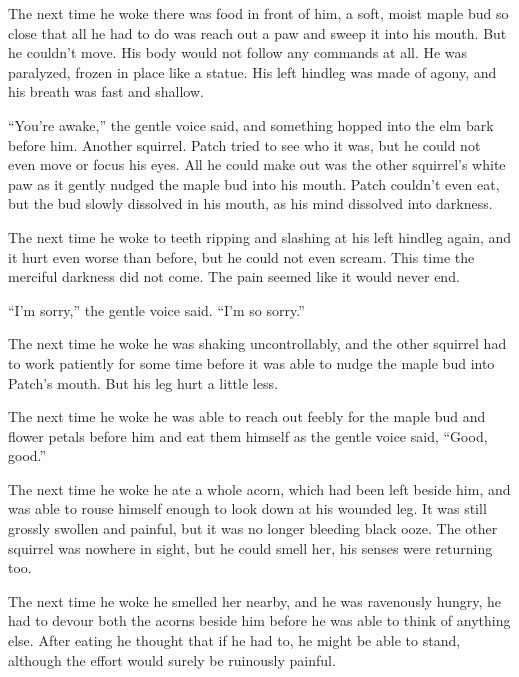 \documentclass[ebook,oneside,openany,17pt]{memoir}
\newenvironment{tolerant}[1]{%
  \par\tolerance=#1\relax
}{%
  \par
}
\begin{document}
The next time he woke there was food in front of him, a soft, moist
maple bud so close that all he had to do was reach out a paw and sweep
it into his mouth. But he couldn’t move. His body would not follow any
commands at all. He was paralyzed, frozen in place like a statue. His
left hindleg was made of agony, and his breath was fast and shallow.

\begin{tolerant}{500}
“You’re awake,” the gentle voice said, and something hopped into the
elm bark before him. Another squirrel. Patch tried to see who it was,
but he could not even move or focus his eyes. All he could make out
was the other squirrel’s white paw as it gently nudged the maple bud
into his mouth. Patch couldn’t even eat, but the bud slowly dissolved
in his mouth, as his mind dissolved into darkness.
\end{tolerant}

\begin{tolerant}{500}
The next time he woke to teeth ripping and slashing at his left
hindleg again, and it hurt even worse than before, but he could not
even scream. This time the merciful darkness did not come. The pain
seemed like it would never end.
\end{tolerant}

“I’m sorry,” the gentle voice said. “I’m so sorry.”

The next time he woke he was shaking uncontrollably, and the other
squirrel had to work patient\-ly for some time before it was able to
nudge the maple bud into Patch’s mouth. But his leg hurt a little
less.

The next time he woke he was able to reach out feebly for the maple
bud and flower petals before him and eat them himself as the gentle
voice said, “Good, good.”

\begin{tolerant}{500}
The next time he woke he ate a whole acorn, which had been left beside
him, and was able to rouse himself enough to look down at his wounded
leg. It was still grossly swollen and painful, but it was no longer
bleeding black ooze. The other squirrel was nowhere in sight, but he
could smell her, his senses were returning too.
\end{tolerant}

The next time he woke he smelled her nearby, and he was ravenously
hungry, he had to devour both the acorns beside him before he was able
to think of anything else. After eating he thought that if he had to,
he might be able to stand, although the effort would surely be
ruinously painful.
\end{document}
